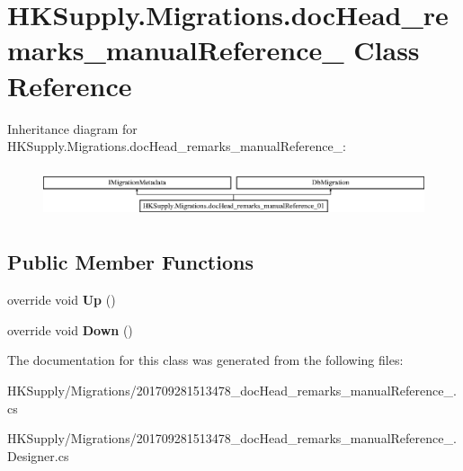 \hypertarget{class_h_k_supply_1_1_migrations_1_1doc_head__remarks__manual_reference__01}{}\section{H\+K\+Supply.\+Migrations.\+doc\+Head\+\_\+remarks\+\_\+manual\+Reference\+\_ Class Reference}
\label{class_h_k_supply_1_1_migrations_1_1doc_head__remarks__manual_reference__01}
Inheritance diagram for H\+K\+Supply.\+Migrations.\+doc\+Head\+\_\+remarks\+\_\+manual\+Reference\+\_\+:\begin{figure}[H]
\begin{center}
\leavevmode
\includegraphics[height=1.501341cm]{class_h_k_supply_1_1_migrations_1_1doc_head__remarks__manual_reference__01}
\end{center}
\end{figure}
\subsection*{Public Member Functions}
\begin{DoxyCompactItemize}
\item 
\mbox{\label{class_h_k_supply_1_1_migrations_1_1doc_head__remarks__manual_reference__01_a4ac0783dfbdc66ff8bfb75673d29909c}} 
override void {\bfseries Up} ()
\item 
\mbox{\label{class_h_k_supply_1_1_migrations_1_1doc_head__remarks__manual_reference__01_a40104d3e4999d17ea01dbe394de7ab99}} 
override void {\bfseries Down} ()
\end{DoxyCompactItemize}


The documentation for this class was generated from the following files\+:\begin{DoxyCompactItemize}
\item 
H\+K\+Supply/\+Migrations/201709281513478\+\_\+doc\+Head\+\_\+remarks\+\_\+manual\+Reference\+\_.\+cs\item 
H\+K\+Supply/\+Migrations/201709281513478\+\_\+doc\+Head\+\_\+remarks\+\_\+manual\+Reference\+\_.\+Designer.\+cs\end{DoxyCompactItemize}
